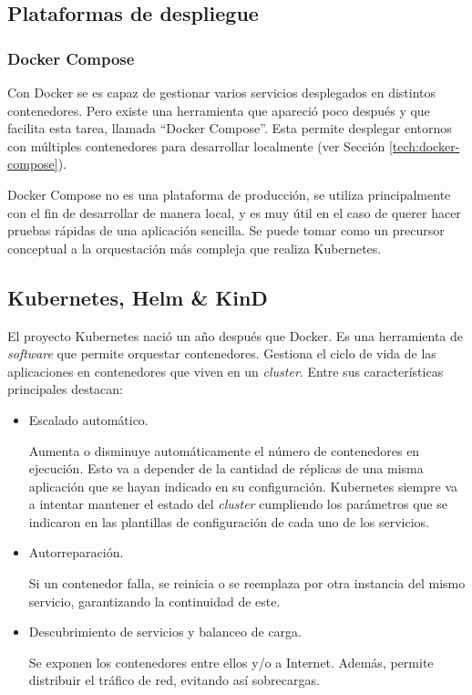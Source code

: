 \subsection*{Plataformas de despliegue}

\subsubsection*{Docker Compose}
\label{subsec:docker-compose}

Con Docker se es capaz de gestionar varios servicios desplegados en distintos contenedores. Pero existe una herramienta que apareció poco después y que facilita esta tarea, llamada ``Docker Compose''\cite{docker-compose}. Esta permite desplegar entornos con múltiples contenedores para desarrollar localmente (ver Sección \ref{tech:docker-compose}).

Docker Compose no es una plataforma de producción, se utiliza principalmente con el fin de desarrollar de manera local, y es muy útil en el caso de querer hacer pruebas rápidas de una aplicación sencilla. Se puede tomar como un precursor conceptual a la orquestación más compleja que realiza Kubernetes.

\subsection*{Kubernetes, Helm \& KinD}
\label{subsec:k8shelm}

El proyecto Kubernetes nació un año después que Docker. Es una herramienta de \textit{software} que permite orquestar contenedores. Gestiona el ciclo de vida de las aplicaciones en contenedores que viven en un \textit{cluster}. Entre sus características principales destacan:

\begin{itemize}
  \item Escalado automático.

    Aumenta o disminuye automáticamente el número de contenedores en ejecución. Esto va a depender de la cantidad de réplicas de una misma aplicación que se hayan indicado en su configuración. Kubernetes siempre va a intentar mantener el estado del \textit{cluster} cumpliendo los parámetros que se indicaron en las plantillas de configuración de cada uno de los servicios.

  \item Autorreparación.

    Si un contenedor falla, se reinicia o se reemplaza por otra instancia del mismo servicio, garantizando la continuidad de este.

  \item Descubrimiento de servicios y balanceo de carga.

    Se exponen los contenedores entre ellos y/o a Internet. Además, permite distribuir el tráfico de red, evitando así sobrecargas.
\end{itemize}

